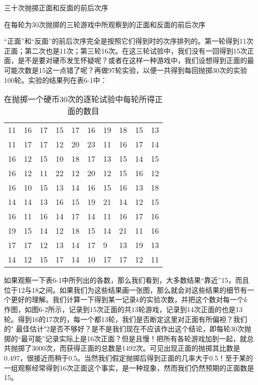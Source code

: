 \documentclass[12pt,oneside]{book}
\begin{document}
\begin{common-format}
\begin{fig}{三十次抛掷正面和反面的前后次序}
\caption{\footnotesize 在每轮为30次抛掷的三轮游戏中所观察到的正面和反面的前后次序}
\label{fig:三十次抛掷正面和反面的前后次序}
\end{fig}
“正面”和“反面”的前后次序完全是按照它们得到时的次序排列的。第一轮得到11次正面；第二次也是11次；第三轮16次。在这三轮试验中，我们没有一回得到15次正面，是不是要对硬币发生怀疑呢？或者在这样一种游戏中，我们设想得到正面的最可能次数是15这一点错了呢？再做97轮实验，以便一共得到每回抛掷30次的实验100轮。实验的结果列在表6-1中：
\begin{table}[H]
\caption{\footnotesize 在抛掷一个硬币30次的逐轮试验中每轮所得正面的数目}
\centering
\medskip 
\begin{tabular}{p{20pt} p{20pt} p{20pt} p{20pt} p{20pt} p{20pt} p{20pt} p{20pt} p{20pt} p{20pt}}
\toprule
11 & 16 & 17 & 15 & 17 & 16 & 19 & 18 & 15 & 13     \\
11 & 17 & 17 & 12 & 20 & 23 & 11 & 16 & 17 & 14       \\
16 & 12 & 15 & 10 & 18 & 17 & 13 & 15 & 14 & 15     \\
16 & 12 & 11 & 22 & 12 & 20 & 12 & 15 & 16 & 12       \\
16 & 10 & 15 & 13 & 14 & 16 & 15 & 16 & 13 & 18       \\
14 & 14 & 13 & 16 & 15 & 19 & 21 & 14 & 12 & 15      \\
16 & 11 & 16 & 14 & 17 & 14 & 11 & 16 & 17 & 16      \\
19 & 15 & 14 & 12 & 18 & 15 & 14 & 21 & 11 & 16      \\
17 & 17 & 12 & 13 & 14 & 17 & 9  & 13 & 19 & 13    \\
14 & 12 & 15 & 17 & 14 & 10 & 17 & 17 & 12 & 11      \\    
\bottomrule        
\end{tabular}
\end{table}

如果观察一下表6-1中所列出的各数，那么我们看到，大多数结果“靠近”15，而且位于12与18之间。如果我们为这些结果画一张图，那么就会对这些结果的细节有一个更好的理解。我们计算一下得到某一记录$k$的实验次数，并把这个数对每一个$k$作图，如图6-2所示，记录到15次正面的共13轮游戏，记录到14次正面的也是13轮。得到16的17次的，每一个都13轮，我们是否断定这里对正面有所偏袒？我们的" 最佳估计"2是否不够好？是不是我们现在不应该作出这个结论，即每轮30次抛掷的“最可能”记录实际上是16次正面？但是且慢！把所有各轮游戏加到一起，就总共抛掷了3000次，而获得正面的总数是1492次。可见出现正面的抛掷其比数是0.497，很接近而稍于0.5。当然我们假定抛掷后得到正面的几率大于0.5！至于某的一组观察经常得到16次正面这个事实，是一种现象，然而我们仍然预期的正面数是15。


\end{common-format}
\end{document}

